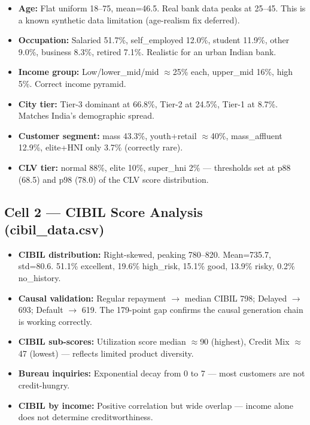 \documentclass[12pt,a4paper]{article}
\begin{document}
\begin{itemize}[leftmargin=*,itemsep=2pt]
  \item \textbf{Age:} Flat uniform 18--75, mean=46.5. Real bank data peaks at 25--45. This is a known synthetic data limitation (age-realism fix deferred).
  \item \textbf{Occupation:} Salaried 51.7\%, self\_employed 12.0\%, student 11.9\%, other 9.0\%, business 8.3\%, retired 7.1\%. Realistic for an urban Indian bank.
  \item \textbf{Income group:} Low/lower\_mid/mid $\approx$25\% each, upper\_mid 16\%, high 5\%. Correct income pyramid.
  \item \textbf{City tier:} Tier-3 dominant at 66.8\%, Tier-2 at 24.5\%, Tier-1 at 8.7\%. Matches India's demographic spread.
  \item \textbf{Customer segment:} mass 43.3\%, youth+retail $\approx$40\%, mass\_affluent 12.9\%, elite+HNI only 3.7\% (correctly rare).
  \item \textbf{CLV tier:} normal 88\%, elite 10\%, super\_hni 2\% — thresholds set at p88 (68.5) and p98 (78.0) of the CLV score distribution.
\end{itemize}

\subsection{Cell 2 — CIBIL Score Analysis (cibil\_data.csv)}

\begin{itemize}[leftmargin=*,itemsep=2pt]
  \item \textbf{CIBIL distribution:} Right-skewed, peaking 780--820. Mean=735.7, std=80.6. 51.1\% excellent, 19.6\% high\_risk, 15.1\% good, 13.9\% risky, 0.2\% no\_history.
  \item \textbf{Causal validation:} Regular repayment $\rightarrow$ median CIBIL 798; Delayed $\rightarrow$ 693; Default $\rightarrow$ 619. The 179-point gap confirms the causal generation chain is working correctly.
  \item \textbf{CIBIL sub-scores:} Utilization score median $\approx$90 (highest), Credit Mix $\approx$47 (lowest) — reflects limited product diversity.
  \item \textbf{Bureau inquiries:} Exponential decay from 0 to 7 — most customers are not credit-hungry.
  \item \textbf{CIBIL by income:} Positive correlation but wide overlap — income alone does not determine creditworthiness.
\end{itemize}
\end{document}
